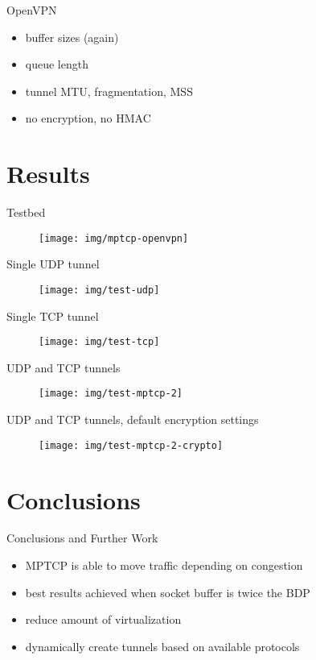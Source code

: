 \documentclass{beamer}
\begin{document}
\begin{frame}{OpenVPN}
  \begin{itemize}
    \item buffer sizes (again)
    \item queue length
    \item tunnel MTU, fragmentation, MSS
    \item no encryption, no HMAC
  \end{itemize}
\end{frame}

\section{Results}
\begin{frame}{Testbed}
  \begin{figure}
    \texttt{[image: img/mptcp-openvpn]}
  \end{figure}
\end{frame}

\begin{frame}{Single UDP tunnel}
  \begin{figure}
    \texttt{[image: img/test-udp]}
  \end{figure}
\end{frame}

\begin{frame}{Single TCP tunnel}
  \begin{figure}
    \texttt{[image: img/test-tcp]}
  \end{figure}
\end{frame}

\begin{frame}{UDP and TCP tunnels}
  \begin{figure}
    \texttt{[image: img/test-mptcp-2]}
  \end{figure}
\end{frame}

\begin{frame}{UDP and TCP tunnels, default encryption settings}
  \begin{figure}
    \texttt{[image: img/test-mptcp-2-crypto]}
  \end{figure}

\end{frame}

\section{Conclusions}
\begin{frame}{Conclusions and Further Work}
\begin{itemize}
    \item MPTCP is able to move traffic depending on congestion
    \item best results achieved when socket buffer is twice the BDP
    \item reduce amount of virtualization
    \item dynamically create tunnels based on available protocols
  \end{itemize}
\end{frame}
\end{document}
